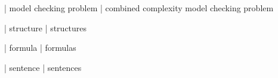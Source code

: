 
| model checking problem
| combined complexity model checking problem


| structure
| structures


| formula
| formulas

| sentence
| sentences

